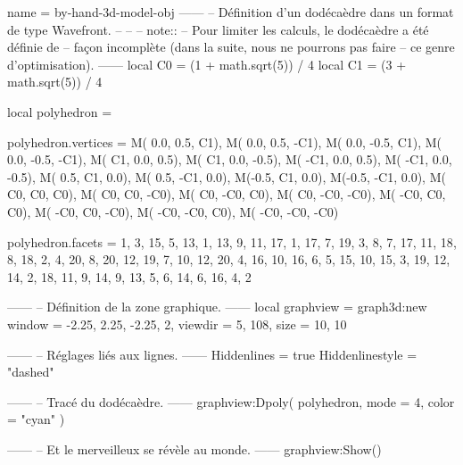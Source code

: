 \documentclass{standalone}
\begin{document}
\begin{luadraw}{name = by-hand-3d-model-obj}
------
-- Définition d'un dodécaèdre dans un format de type Wavefront.
--
--
-- note::
--     Pour limiter les calculs, le dodécaèdre a été définie de
--     façon incomplète (dans la suite, nous ne pourrons pas faire
--     ce genre d'optimisation).
------
local C0 = (1 + math.sqrt(5)) / 4
local C1 = (3 + math.sqrt(5)) / 4

local polyhedron = {}

polyhedron.vertices = {
  M( 0.0,  0.5,   C1),
  M( 0.0,  0.5,  -C1),
  M( 0.0, -0.5,   C1),
  M( 0.0, -0.5,  -C1),
  M(  C1,  0.0,  0.5),
  M(  C1,  0.0, -0.5),
  M( -C1,  0.0,  0.5),
  M( -C1,  0.0, -0.5),
  M( 0.5,   C1,  0.0),
  M( 0.5,  -C1,  0.0),
  M(-0.5,   C1,  0.0),
  M(-0.5,  -C1,  0.0),
  M(  C0,   C0,   C0),
  M(  C0,   C0,  -C0),
  M(  C0,  -C0,   C0),
  M(  C0,  -C0,  -C0),
  M( -C0,   C0,   C0),
  M( -C0,   C0,  -C0),
  M( -C0,  -C0,   C0),
  M( -C0,  -C0,  -C0)
}

polyhedron.facets = {
  {  1,  3, 15,  5, 13},
  {  1, 13,  9, 11, 17},
  {  1, 17,  7, 19,  3},
  {  8,  7, 17, 11, 18},
  {  8, 18,  2,  4, 20},
  {  8, 20, 12, 19,  7},
  { 10, 12, 20,  4, 16},
  { 10, 16,  6,  5, 15},
  { 10, 15,  3, 19, 12},
  { 14,  2, 18, 11,  9},
  { 14,  9, 13,  5,  6},
  { 14,  6, 16,  4,  2}
}

------
-- Définition de la zone graphique.
------
local graphview = graph3d:new{
  window  = {-2.25, 2.25, -2.25, 2},
  viewdir = {5, 108},
  size    = {10, 10}
}

------
-- Réglages liés aux lignes.
------
Hiddenlines     = true
Hiddenlinestyle = "dashed"

------
-- Tracé du dodécaèdre.
------
graphview:Dpoly(
  polyhedron,
  {
    mode  = 4,
    color = "cyan"
  })

------
-- Et le merveilleux se révèle au monde.
------
graphview:Show()
\end{luadraw}
\end{document}
